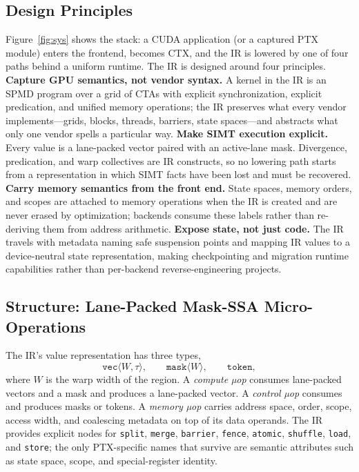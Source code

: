 \documentclass[sigplan,nonacm]{acmart}
\begin{document}
\subsection{Design Principles}
\label{sec:ir-principles}

Figure~\ref{fig:sys} shows the stack: a CUDA application (or a captured PTX
module) enters the frontend, becomes CTX, and the IR is lowered by one of
four paths behind a uniform runtime.  The IR is designed around four
principles.  \textbf{Capture GPU semantics,
not vendor syntax.}  A kernel in the IR is an SPMD program over a grid of
CTAs with explicit synchronization, explicit predication, and unified memory
operations; the IR preserves what every vendor implements---grids, blocks,
threads, barriers, state spaces---and abstracts what only one vendor spells a
particular way.  \textbf{Make SIMT execution explicit.}  Every value is a
lane-packed vector paired with an active-lane mask.  Divergence, predication,
and warp collectives are IR constructs, so no lowering path starts from a
representation in which SIMT facts have been lost and must be recovered.
\textbf{Carry memory semantics from the front end.}  State spaces, memory
orders, and scopes are attached to memory operations when the IR is created
and are never erased by optimization; backends consume these labels rather
than re-deriving them from address arithmetic.  \textbf{Expose state, not
just code.}  The IR travels with metadata naming safe suspension points and
mapping IR values to a device-neutral state representation, making
checkpointing and migration runtime capabilities rather than per-backend
reverse-engineering projects.

\subsection{Structure: Lane-Packed Mask-SSA Micro-Operations}
\label{sec:ir-uops}

The IR's value representation has three types,
\[
  \texttt{vec}\langle W,\tau\rangle,\qquad
  \texttt{mask}\langle W\rangle,\qquad
  \texttt{token},
\]
where $W$ is the warp width of the region.  A \emph{compute µop} consumes
lane-packed vectors and a mask and produces a lane-packed vector.  A
\emph{control µop} consumes and produces masks or tokens.  A \emph{memory
µop} carries address space, order, scope, access width, and coalescing
metadata on top of its data operands.  The IR provides explicit nodes for
\texttt{split}, \texttt{merge}, \texttt{barrier}, \texttt{fence},
\texttt{atomic}, \texttt{shuffle}, \texttt{load}, and \texttt{store}; the
only PTX-specific names that survive are semantic attributes such as state
space, scope, and special-register identity.
\end{document}
